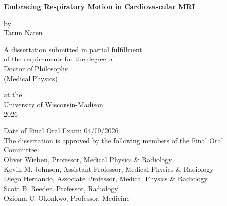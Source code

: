 \begin{titlepage}
    \begin{center}
        \vspace*{1cm}
        
        \LARGE
        \textbf{Embracing Respiratory Motion in Cardiovascular MRI}
        
        \vspace{0.5cm}
        \LARGE
        by\\
    
        Tarun Naren \\
        
        \vfill
        
        \Large
        A dissertation submitted in partial fulfillment\\
        of the requirements for the degree of\\
        Doctor of Philosophy\\
        (Medical Physics)\\
    
        
        \vspace{1.8cm}

        
        \Large
        at the\\University of Wisconsin-Madison\\
        2026\\
        \vspace{1.0cm}
        \begin{flushleft}
        \small
        Date of Final Oral Exam:  04/09/2026\\
        The dissertation is approved by the following members of the Final Oral Committee: \\
        \setlength{\parindent}{10ex}
        Oliver Wieben, Professor, Medical Physics \& Radiology\\
        Kevin M. Johnson, Assistant Professor, Medical Physics \& Radiology\\
        Diego Hernando, Associate Professor, Medical Physics \& Radiology\\
        Scott B. Reeder, Professor, Radiology\\
        Ozioma C. Okonkwo, Professor, Medicine\\
        \end{flushleft}
        
    \end{center}
    
\end{titlepage}